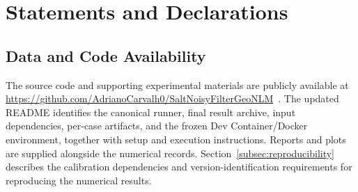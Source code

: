 \documentclass[pdflatex,iicol,sn-mathphys-num]{sn-jnl}
\newif\ifshowportuguese
\newcommand{\pt}[1]{\ifshowportuguese\par\begingroup\small\color{blue!55!black}\noindent\textbf{PT: }#1\par\endgroup\fi}
\begin{document}
\pt{Alexandre L. M. Levada agradece ao CNPq pelo apoio financeiro por meio do processo 301432/2025-2. Adriano R. Carvalho agradece ao Instituto Federal de Educação, Ciência e Tecnologia do Sul de Minas Gerais pelo apoio institucional por meio do Programa de Incentivo à Qualificação Acadêmica e pela concessão de afastamento parcial de suas atividades profissionais para cursar o doutorado. Este trabalho também foi financiado em parte pela Coordenação de Aperfeiçoamento de Pessoal de Nível Superior -- Brasil (CAPES), Código de Financiamento 001.}
\section*{Statements and Declarations}
\subsection*{Data and Code Availability}
The source code and supporting experimental materials are publicly available at \url{https://github.com/AdrianoCarvalh0/SaltNoisyFilterGeoNLM}~\cite{carvalho2026saltcode}. The updated README identifies the canonical runner, final result archive, input dependencies, per-case artifacts, and the frozen Dev Container/Docker environment, together with setup and execution instructions. Reports and plots are supplied alongside the numerical records. Section~\ref{subsec:reproducibility} describes the calibration dependencies and version-identification requirements for reproducing the numerical results.
\pt{O código-fonte e os materiais experimentais de apoio estão disponíveis publicamente em \url{https://github.com/AdrianoCarvalh0/SaltNoisyFilterGeoNLM}~\cite{carvalho2026saltcode}. O README atualizado identifica o executor canônico, o arquivo final de resultados, as dependências de entrada, os artefatos por caso e o ambiente Dev Container/Docker congelado, juntamente com instruções de configuração e execução. Relatórios e gráficos são fornecidos junto aos registros numéricos. A Seção~\ref{subsec:reproducibility} descreve as dependências da calibração e os requisitos de identificação de versão para reproduzir os resultados numéricos.}


\end{document}
